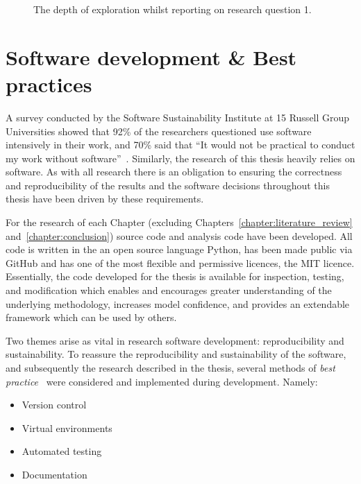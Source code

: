 \begin{figure}[!hbtp]
    \centering
    
    \caption{The depth of exploration whilst reporting on research question 1.}\label{fig:depth_structure}
\end{figure}

\section{Software development \& Best practices}\label{section:introduction_software_development}

A survey conducted by the Software Sustainability Institute at 15 Russell Group
Universities showed that 92\% of the researchers questioned use software
intensively in their work, and 70\% said that ``It would not be practical to
conduct my work without software''~\cite{ssi_blog}. Similarly, the research of
this thesis heavily relies on software. As with all research there is an
obligation to ensuring the correctness and reproducibility of the results and the
software decisions throughout this thesis have been driven by these
requirements.

For the research of each Chapter (excluding Chapters~\ref{chapter:literature_review}
and~\ref{chapter:conclusion}) source code and analysis code have been developed.
All code is written in the an open source language Python, has been made public
via GitHub and has one of the most flexible and permissive licences, the MIT
licence. Essentially, the code developed for the thesis is available for inspection,
testing, and modification which enables and encourages
greater understanding of the underlying methodology, increases model confidence,
and provides an extendable framework which can be used by others.

Two themes arise as vital in research software development:
reproducibility and sustainability. To reassure the reproducibility and
sustainability of the software, and subsequently the research described in the
thesis, several methods of
\textit{best practice}~\cite{Aberdour2007, Benureau2018, Crick2014, Hong2015}
were considered and implemented during development. Namely:

\begin{itemize}
    \item Version control
    \item Virtual environments
    \item Automated testing
    \item Documentation
\end{itemize}

